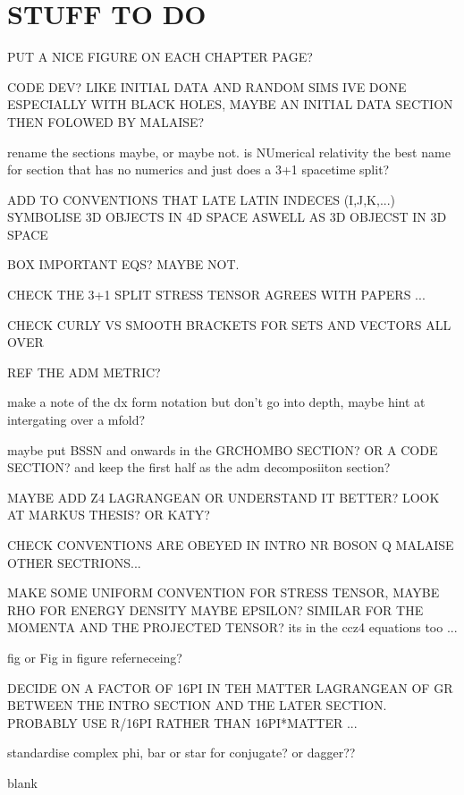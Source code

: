 \documentclass[11pt]{report}  %
\numberwithin{equation}{section}
\begin{document}




\chapter{STUFF TO DO}
PUT A NICE FIGURE ON EACH CHAPTER PAGE?

CODE DEV? LIKE INITIAL DATA AND RANDOM SIMS IVE DONE ESPECIALLY WITH BLACK HOLES, MAYBE AN INITIAL DATA SECTION THEN FOLOWED BY MALAISE?

rename the sections maybe, or maybe not. is NUmerical relativity the best name for section that has no numerics and just does a 3+1 spacetime split?

ADD TO CONVENTIONS THAT LATE LATIN INDECES (I,J,K,...) SYMBOLISE 3D OBJECTS IN 4D SPACE ASWELL AS 3D OBJECST IN 3D SPACE

BOX IMPORTANT EQS? MAYBE NOT.

CHECK THE 3+1 SPLIT STRESS TENSOR AGREES WITH PAPERS ...

CHECK CURLY VS SMOOTH BRACKETS FOR SETS AND VECTORS ALL OVER

REF THE ADM METRIC?

make a note of the dx form notation but don't go into depth, maybe hint at intergating over a mfold?

maybe put BSSN and onwards in the GRCHOMBO SECTION? OR A CODE SECTION? and keep the first half as the adm decomposiiton section?

MAYBE ADD Z4 LAGRANGEAN OR UNDERSTAND IT BETTER? LOOK AT MARKUS THESIS? OR KATY?

CHECK CONVENTIONS ARE OBEYED IN
INTRO
NR
BOSON
Q
MALAISE
OTHER SECTRIONS...

MAKE SOME UNIFORM CONVENTION FOR STRESS TENSOR, MAYBE RHO FOR ENERGY DENSITY MAYBE EPSILON? SIMILAR FOR THE MOMENTA AND THE PROJECTED TENSOR? its in the ccz4 equations too ...

fig or Fig in figure referneceing?

DECIDE ON A FACTOR OF 16PI IN TEH MATTER LAGRANGEAN OF GR BETWEEN THE INTRO SECTION AND THE LATER SECTION. PROBABLY USE R/16PI RATHER THAN 16PI*MATTER ... 

standardise complex phi, bar or star for conjugate? or dagger??



\begin{thebibliography}{9}

%
%


blank
  \end{thebibliography}



  
\end{document}
